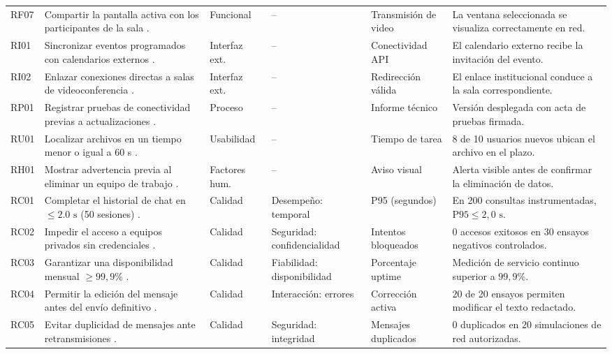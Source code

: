 \documentclass[11pt,a4paper]{article}
\begin{document}
\begin{longtable}{p{0.8cm} p{4.3cm} p{1.6cm} p{2.3cm} p{2.2cm} p{2.8cm}}
		RF07 & Compartir la pantalla activa con los participantes de la sala \cite{iso29148_2018}. & Funcional & -- & Transmisión de video & La ventana seleccionada se visualiza correctamente en red. \\
		RI01 & Sincronizar eventos programados con calendarios externos \cite{iso29148_2018}. & Interfaz ext. & -- & Conectividad API & El calendario externo recibe la invitación del evento. \\
		RI02 & Enlazar conexiones directas a salas de videoconferencia \cite{iso29148_2018}. & Interfaz ext. & -- & Redirección válida & El enlace institucional conduce a la sala correspondiente. \\
		RP01 & Registrar pruebas de conectividad previas a actualizaciones \cite{iso29148_2018}. & Proceso & -- & Informe técnico & Versión desplegada con acta de pruebas firmada. \\
		RU01 & Localizar archivos en un tiempo menor o igual a 60 s \cite{iso29148_2018}. & Usabilidad & -- & Tiempo de tarea & 8 de 10 usuarios nuevos ubican el archivo en el plazo. \\
		RH01 & Mostrar advertencia previa al eliminar un equipo de trabajo \cite{iso29148_2018}. & Factores hum. & -- & Aviso visual & Alerta visible antes de confirmar la eliminación de datos. \\
		RC01 & Completar el historial de chat en $\le 2.0\text{ s}$ (50 sesiones) \cite{iso25010_2023}. & Calidad & Desempeño: temporal & P95 (segundos) & En 200 consultas instrumentadas, $\text{P95} \le 2,0\text{ s}$. \\
		RC02 & Impedir el acceso a equipos privados sin credenciales \cite{iso25010_2023}. & Calidad & Seguridad: confidencialidad & Intentos bloqueados & 0 accesos exitosos en 30 ensayos negativos controlados. \\
		RC03 & Garantizar una disponibilidad mensual $\ge 99,9\%$ \cite{iso25010_2023}. & Calidad & Fiabilidad: disponibilidad & Porcentaje uptime & Medición de servicio continuo superior a $99,9\%$. \\
		RC04 & Permitir la edición del mensaje antes del envío definitivo \cite{iso25010_2023}. & Calidad & Interacción: errores & Corrección activa & 20 de 20 ensayos permiten modificar el texto redactado. \\
		RC05 & Evitar duplicidad de mensajes ante retransmisiones \cite{iso25010_2023}. & Calidad & Seguridad: integridad & Mensajes duplicados & 0 duplicados en 20 simulaciones de red autorizadas. \\
		\bottomrule
	\end{longtable}
	
\end{document}
